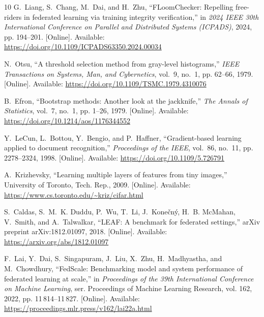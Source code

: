 \documentclass[journal]{IEEEtran}
\begin{document}
\begin{thebibliography}{10}
\BIBentryALTinterwordspacing
G.~Liang, S.~Chang, M.~Dai, and H.~Zhu, ``{FLoomChecker}: Repelling free-riders
  in federated learning via training integrity verification,'' in \emph{2024
  IEEE 30th International Conference on Parallel and Distributed Systems
  (ICPADS)}, 2024, pp. 194--201. [Online]. Available:
  \url{https://doi.org/10.1109/ICPADS63350.2024.00034}
\BIBentrySTDinterwordspacing

\BIBentryALTinterwordspacing
N.~Otsu, ``A threshold selection method from gray-level histograms,''
  \emph{IEEE Transactions on Systems, Man, and Cybernetics}, vol.~9, no.~1, pp.
  62--66, 1979. [Online]. Available:
  \url{https://doi.org/10.1109/TSMC.1979.4310076}
\BIBentrySTDinterwordspacing

\BIBentryALTinterwordspacing
B.~Efron, ``Bootstrap methods: Another look at the jackknife,'' \emph{The
  Annals of Statistics}, vol.~7, no.~1, pp. 1--26, 1979. [Online]. Available:
  \url{https://doi.org/10.1214/aos/1176344552}
\BIBentrySTDinterwordspacing

\BIBentryALTinterwordspacing
Y.~LeCun, L.~Bottou, Y.~Bengio, and P.~Haffner, ``Gradient-based learning
  applied to document recognition,'' \emph{Proceedings of the IEEE}, vol.~86,
  no.~11, pp. 2278--2324, 1998. [Online]. Available:
  \url{https://doi.org/10.1109/5.726791}
\BIBentrySTDinterwordspacing

\BIBentryALTinterwordspacing
A.~Krizhevsky, ``Learning multiple layers of features from tiny images,''
  University of Toronto, Tech. Rep., 2009. [Online]. Available:
  \url{https://www.cs.toronto.edu/~kriz/cifar.html}
\BIBentrySTDinterwordspacing

\BIBentryALTinterwordspacing
S.~Caldas, S.~M.~K. Duddu, P.~Wu, T.~Li, J.~Kone{\v{c}}n{\'y}, H.~B. McMahan,
  V.~Smith, and A.~Talwalkar, ``{LEAF}: A benchmark for federated settings,''
  arXiv preprint arXiv:1812.01097, 2018. [Online]. Available:
  \url{https://arxiv.org/abs/1812.01097}
\BIBentrySTDinterwordspacing

\BIBentryALTinterwordspacing
F.~Lai, Y.~Dai, S.~Singapuram, J.~Liu, X.~Zhu, H.~Madhyastha, and M.~Chowdhury,
  ``{FedScale}: Benchmarking model and system performance of federated learning
  at scale,'' in \emph{Proceedings of the 39th International Conference on
  Machine Learning}, ser. Proceedings of Machine Learning Research, vol. 162,
  2022, pp. 11\,814--11\,827. [Online]. Available:
  \url{https://proceedings.mlr.press/v162/lai22a.html}
\BIBentrySTDinterwordspacing

\end{thebibliography}

\end{document}

